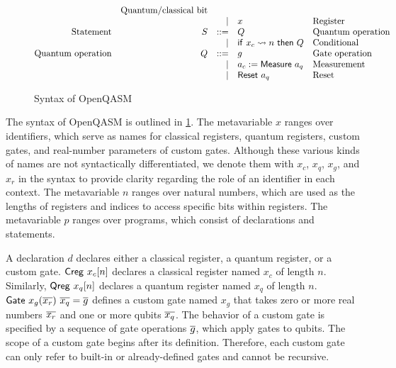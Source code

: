 \begin{figure}[t]
\[\begin{array}{@{}rrrll@{}}
			                         & \text{Quantum/classical bit}                                                                                                       \\
			                         &                              & |                       & x                                          & \text{Register}              \\
			\text{Statement}         & S                            & ::=                     & Q                                          & \text{Quantum operation}     \\
			                         &                              & |                       & \iif{x_c}{n}{Q}                            & \text{Conditional}           \\
			\text{Quantum operation} & Q                            & ::=                     & g                                          & \text{Gate operation}        \\
			                         &                              & |                       & \imeasure{a_q}{a_c}                        & \text{Measurement}           \\
			                         &                              & |                       & \ireset{a_q}                               & \text{Reset}                 \\
		\end{array}
	\]
	\caption{Syntax of OpenQASM}
	\label{fig:openqasm-syntax}
\end{figure}

\noindent
The syntax of OpenQASM is outlined in \cref{fig:openqasm-syntax}.
%
The metavariable $x$ ranges over identifiers, which serve as names for
classical registers, quantum registers, custom gates, and real-number
parameters of custom gates.
%
Although these various kinds of names are not syntactically differentiated, we
denote them with $x_c$, $x_q$, $x_g$, and $x_r$ in the syntax to provide
clarity regarding the role of an identifier in each context.
%
The metavariable $n$ ranges over natural numbers, which are used as the lengths
of registers and indices to access specific bits within registers.
%
The metavariable $p$ ranges over programs, which consist of declarations and
statements.

A declaration $d$ declares either a classical register, a quantum register, or
a custom gate.
%
$\mathsf{Creg}\ x_c[n]$ declares a classical register named $x_c$ of length $n$.
%
Similarly, $\mathsf{Qreg}\ x_q[n]$ declares a quantum register named $x_q$ of length
$n$.
%
$\mathsf{Gate}\ x_g(\overline{x_r})\ \overline{x_q}=\overline{g}$ defines a custom gate named $x_g$
that takes zero or more real numbers $\overline{x_r}$ and one or more qubits
$\overline{x_q}$.
%
The behavior of a custom gate is specified by a sequence of gate operations
$\overline{g}$, which apply gates to qubits.
%
The scope of a custom gate begins after its definition.
%
Therefore, each custom gate can only refer to built-in or already-defined gates
and cannot be recursive.

